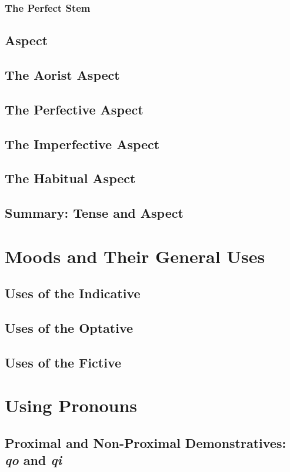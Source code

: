 \documentclass[oneside]{book}
\begin{document}
\subsection{The Perfect Stem}

\section{Aspect}
\section{The Aorist Aspect}
\section{The Perfective Aspect}
\section{The Imperfective Aspect}
\section{The Habitual Aspect}

\section{Summary: Tense and Aspect}

\chapter{Moods and Their General Uses}
\section{Uses of the Indicative}
\section{Uses of the Optative}
\section{Uses of the Fictive}

\chapter{Using Pronouns}
\section{Proximal and Non-Proximal Demonstratives: \textit{qo} and \textit{qi}}
\end{document}
